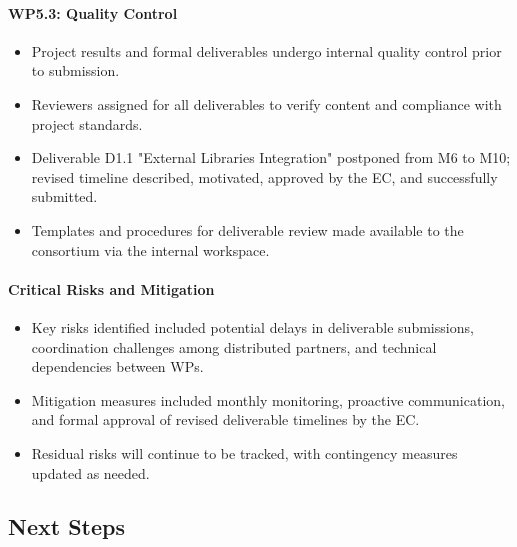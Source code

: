 \documentclass[a4paper,12pt, numbers]{article}
\begin{document}
\paragraph{WP5.3: Quality Control} %

\begin{itemize}[left=1em, itemsep=0pt, topsep=0pt]
\item Project results and formal deliverables undergo internal quality control prior to submission.
\item Reviewers assigned for all deliverables to verify content and compliance with project standards.
\item Deliverable D1.1 "External Libraries Integration" postponed from M6 to M10; revised timeline described, motivated, approved by the EC, and successfully submitted.
\item Templates and procedures for deliverable review made available to the consortium via the internal workspace.
\end{itemize}

\paragraph{Critical Risks and Mitigation}
\begin{itemize}[left=1em, itemsep=0pt, topsep=0pt]
\item Key risks identified included potential delays in deliverable submissions, coordination challenges among distributed partners, and technical dependencies between WPs.
\item Mitigation measures included monthly monitoring, proactive communication, and formal approval of revised deliverable timelines by the EC.
\item Residual risks will continue to be tracked, with contingency measures updated as needed.
\end{itemize}





\subsection{Next Steps} %
\end{document}
